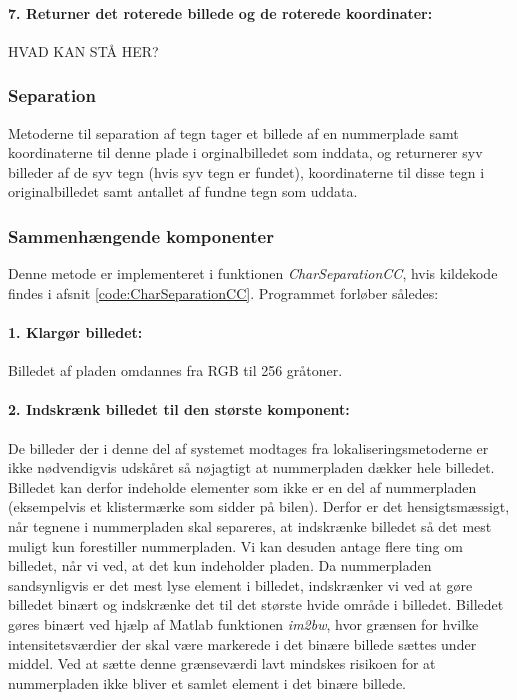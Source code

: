 \paragraph{7. Returner det roterede billede og de roterede koordinater:} HVAD KAN STÅ HER?

\subsubsection{Separation}

Metoderne til separation af tegn tager et billede af en nummerplade samt koordinaterne til denne plade i orginalbilledet som inddata, og returnerer syv billeder af de syv tegn (hvis syv tegn er fundet), koordinaterne til disse tegn i originalbilledet samt antallet af fundne tegn som uddata.

\subsubsection*{Sammenhængende komponenter}

Denne metode er implementeret i funktionen \textit{CharSeparationCC}, hvis kildekode findes i afsnit \vref{code:CharSeparationCC}. Programmet forløber således:

\paragraph{1. Klargør billedet:} Billedet af pladen omdannes fra RGB til 256 gråtoner.

\paragraph{2. Indskrænk billedet til den største komponent:}
De billeder der i denne del af systemet modtages fra lokaliseringsmetoderne er ikke nødvendigvis udskåret så nøjagtigt at nummerpladen dækker hele billedet. Billedet kan derfor indeholde elementer som ikke er en del af nummerpladen (eksempelvis et klistermærke som sidder på bilen). Derfor er det hensigtsmæssigt, når tegnene i nummerpladen skal separeres, at indskrænke billedet så det mest muligt kun forestiller nummerpladen. Vi kan desuden antage flere ting om billedet, når vi ved, at det kun indeholder pladen. Da nummerpladen sandsynligvis er det mest lyse element i billedet, indskrænker vi ved at gøre billedet binært og indskrænke det til det største hvide område i billedet. Billedet gøres binært ved hjælp af Matlab funktionen \textit{im2bw}, hvor grænsen for hvilke intensitetsværdier der skal være markerede i det binære billede sættes under middel. Ved at sætte denne grænseværdi lavt mindskes risikoen for at nummerpladen ikke bliver et samlet element i det binære billede.

